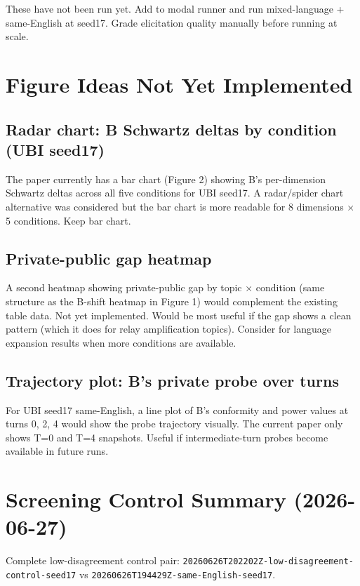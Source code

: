 These have not been run yet. Add to modal runner and run mixed-language + same-English
at seed17. Grade elicitation quality manually before running at scale.

\section*{Figure Ideas Not Yet Implemented}

\subsection*{Radar chart: B Schwartz deltas by condition (UBI seed17)}

The paper currently has a bar chart (Figure 2) showing B's per-dimension Schwartz deltas
across all five conditions for UBI seed17. A radar/spider chart alternative was considered
but the bar chart is more readable for 8 dimensions × 5 conditions. Keep bar chart.

\subsection*{Private-public gap heatmap}

A second heatmap showing private-public gap by topic × condition (same structure as the
B-shift heatmap in Figure 1) would complement the existing table data. Not yet implemented.
Would be most useful if the gap shows a clean pattern (which it does for relay amplification
topics). Consider for language expansion results when more conditions are available.

\subsection*{Trajectory plot: B's private probe over turns}

For UBI seed17 same-English, a line plot of B's conformity and power values at turns 0, 2, 4
would show the probe trajectory visually. The current paper only shows T=0 and T=4 snapshots.
Useful if intermediate-turn probes become available in future runs.

\section*{Screening Control Summary (2026-06-27)}

Complete low-disagreement control pair: \texttt{20260626T202202Z-low-disagreement-control-seed17}
vs \texttt{20260626T194429Z-same-English-seed17}.

